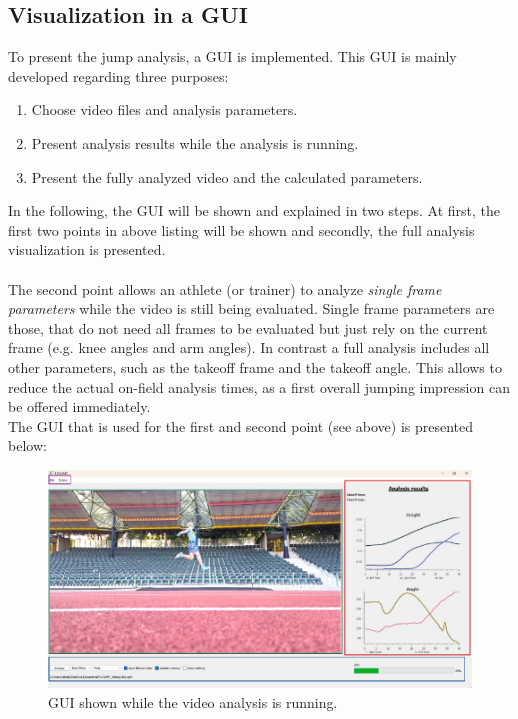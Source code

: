 \subsection{Visualization in a \acs*{GUI}}\label{subsec:4_lj_software_gui}
To present the jump analysis, a \ac{GUI} is implemented.
This \ac{GUI} is mainly developed regarding three purposes:
\begin{enumerate}
    \item Choose video files and analysis parameters.
    \item Present analysis results while the analysis is running.
    \item Present the fully analyzed video and the calculated parameters. 
\end{enumerate}
\noindent In the following, the \ac{GUI} will be shown and explained in two
steps.
At first, the first two points in above listing will be shown
and secondly, the full analysis visualization is presented.\\\\
\noindent The second point allows an athlete (or trainer) to analyze \textit{
single frame parameters} while the video is still being evaluated.
Single frame parameters are those, that do not need all frames to be evaluated
but just rely on the current frame (e.g. knee angles and arm angles).
In contrast a full analysis includes all other parameters, such as the takeoff
frame and the takeoff angle.
This allows to reduce the actual on-field analysis times, as a first overall
jumping impression can be offered immediately.\\
The \ac{GUI} that is used for the first and second point (see above) is
presented below:
\begin{figure}[h!]
    \centering
    \includegraphics[scale=0.9]{GUI_running_analysis.pdf}
    \caption[Analysis \acs*{GUI}]{\acs*{GUI} shown while the video analysis
    is running.}
    \label{fig:4_gui_analysis_running}
\end{figure}
